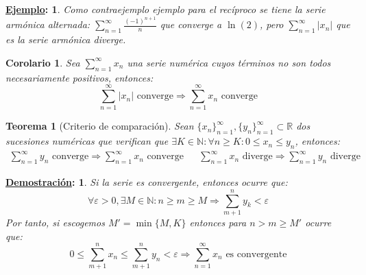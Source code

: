 \documentclass[10pt,a4paper,openright]{book}
\theoremstyle{break}
\newtheorem*{theo}{Teorema}
\newtheorem*{coro}{Corolario}
\newtheorem*{demo}{\underline{Demostración}:}
\newtheorem*{ej}{\underline{Ejemplo}:}
\begin{document}
\begin{ej}
Como contraejemplo ejemplo para el recíproco se tiene la serie armónica alternada: $\sum_{n=1}^{\infty} \frac{(-1)^{n+1}}{n}$ que converge a $\ln(2)$, pero $\sum_{n=1}^{\infty} |x_n|$ que es la serie armónica diverge.
\end{ej}

\begin{coro}
Sea $\sum_{n=1}^{\infty} x_n$ una serie numérica cuyos términos no son todos necesariamente positivos, entonces:
$$\sum_{n=1}^{\infty} |x_n|\mbox{ converge}\Rightarrow \sum_{n=1}^{\infty} x_n\mbox{ converge}$$
\end{coro}

\begin{theo}[Criterio de comparación]
Sean $\{x_n\}_{n=1}^\infty, \{y_n\}_{n=1}^\infty \subset \mathbb{R}$ dos sucesiones numéricas que verifican que $\exists K \in \mathbb{N}: \forall n \geq K : 0 \leq x_n \leq y_n$, entonces:
\begin{align*}
\sum_{n=1}^{\infty} y_n \mbox{ converge} \Rightarrow \sum_{n = 1}^{\infty} x_n \mbox{ converge} & & \sum_{n=1}^{\infty} x_n\mbox{ diverge}\Rightarrow \sum_{n = 1}^{\infty} y_n \mbox{ diverge}
\end{align*}
\end{theo}
\begin{demo}
Si la serie es convergente, entonces ocurre que:
$$\forall \varepsilon > 0, \exists M \in \mathbb{N}: n \geq m \geq M \Rightarrow \sum_{m+1}^{n} y_k	< \varepsilon$$
Por tanto, si escogemos $M'=\min\{M,K\}$ entonces para $n>m\geq M'$ ocurre que:
$$0 \leq \sum_{m+1}^{n} x_n \leq \sum_{m+1}^{n} y_n < \varepsilon \Rightarrow \sum_{n=1}^{\infty} x_n\mbox{ es convergente}$$
\end{demo}
\end{document}
